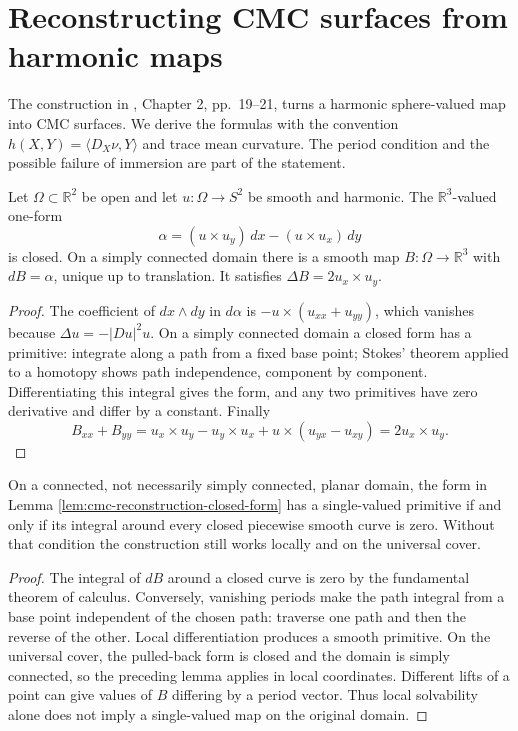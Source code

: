 \chapter{Reconstructing CMC surfaces from harmonic maps}\label{sec:cmc-reconstruction}
The construction in \cite{Hel01}, Chapter 2, pp.~19--21, turns a harmonic sphere-valued map into CMC surfaces. We derive the formulas with the convention $h(X,Y)=\langle D_X\nu,Y\rangle$ and trace mean curvature. The period condition and the possible failure of immersion are part of the statement.

\begin{lemma}\label{lem:cmc-reconstruction-closed-form}
Let $\Omega\subset\mathbb R^2$ be open and let $u:\Omega\to S^2$ be smooth and harmonic. The $\mathbb R^3$-valued one-form
\[
 \alpha=(u\times u_y)\,dx-(u\times u_x)\,dy
\]
is closed. On a simply connected domain there is a smooth map $B:\Omega\to\mathbb R^3$ with $dB=\alpha$, unique up to translation. It satisfies $\Delta B=2u_x\times u_y$.
\end{lemma}
\begin{proof}
The coefficient of $dx\wedge dy$ in $d\alpha$ is $-u\times(u_{xx}+u_{yy})$, which vanishes because $\Delta u=-|Du|^2u$. On a simply connected domain a closed form has a primitive: integrate along a path from a fixed base point; Stokes' theorem applied to a homotopy shows path independence, component by component. Differentiating this integral gives the form, and any two primitives have zero derivative and differ by a constant. Finally
\[
 B_{xx}+B_{yy}=u_x\times u_y-u_y\times u_x+u\times(u_{yx}-u_{xy})=2u_x\times u_y.
\]
\end{proof}

\begin{proposition}\label{prop:cmc-reconstruction-periods}
On a connected, not necessarily simply connected, planar domain, the form in Lemma \ref{lem:cmc-reconstruction-closed-form} has a single-valued primitive if and only if its integral around every closed piecewise smooth curve is zero. Without that condition the construction still works locally and on the universal cover.
\end{proposition}
\begin{proof}
The integral of $dB$ around a closed curve is zero by the fundamental theorem of calculus. Conversely, vanishing periods make the path integral from a base point independent of the chosen path: traverse one path and then the reverse of the other. Local differentiation produces a smooth primitive. On the universal cover, the pulled-back form is closed and the domain is simply connected, so the preceding lemma applies in local coordinates. Different lifts of a point can give values of $B$ differing by a period vector. Thus local solvability alone does not imply a single-valued map on the original domain.
\end{proof}

